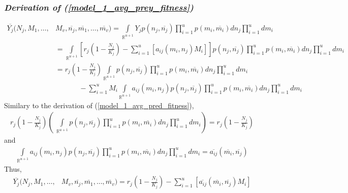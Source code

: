 \documentclass{amsart}
\theoremstyle{definition}
\theoremstyle{remark}
\numberwithin{equation}{section}
\begin{document}
\subsubsection*{\textbf{\textit{Derivation of (\ref{model_1_avg_prey_fitness})}}}
\begin{align*}
	\overline{Y_j}(N_j, M_1, \dots, &M_v, \overline{n_j}, \overline{m_1}, \dots, \overline{m_v}) = \int\limits_{\mathbb{R}^{u+1}}^{}Y_jp(n_j, \overline{n_j})\prod\limits_{i = 1}^{u}p(m_i, \overline{m_i})dn_j\prod\limits_{i = 1}^{u}dm_i \\
	&= \int\limits_{\mathbb{R}^{u+1}}\left[r_j\left(1 - \frac{N_j}{K_j}\right) - \sum\limits_{i = 1}^{u}\left[a_{ij}(m_i, n_j)M_i\right]\right]p(n_j, \overline{n_j})\prod\limits_{i = 1}^{u}p(m_i, \overline{m_i})dn_j\prod\limits_{i = 1}^{u}dm_i \\
	&= r_j\left(1 - \frac{N_j}{K_j}\right)\int\limits_{\mathbb{R}^{u+1}}p(n_j, \overline{n_j})\prod\limits_{i = 1}^{u}p(m_i, \overline{m_i})dn_j\prod\limits_{i = 1}^{u}dm_i \\
	&\ \ \ \ \ \ \ \ \ \ \ \ \ \ \ - \sum\limits_{i=1}^{u}M_i\int\limits_{\mathbb{R}^{u+1}}a_{ij}(m_i, n_j)p(n_j, \overline{n_j})\prod\limits_{i = 1}^{u}p(m_i, \overline{m_i})dn_j\prod\limits_{i = 1}^{u}dm_i
\end{align*}
Similary to the derivation of (\ref{model_1_avg_pred_fitness}),
\begin{align*}
	r_j\left(1 - \frac{N_j}{K_j}\right)\left(\ \int\limits_{\mathbb{R}^{u+1}}p(n_j, \overline{n_j})\prod\limits_{i = 1}^{u}p(m_i, \overline{m_i})dn_j\prod\limits_{i = 1}^{u}dm_i\right) = r_j\left(1 - \frac{N_j}{K_j}\right)
\end{align*}
and
\begin{align*}
	\int\limits_{\mathbb{R}^{u+1}}a_{ij}(m_i, n_j)p(n_j, \overline{n_j})\prod\limits_{i = 1}^{u}p(m_i, \overline{m_i})dn_j\prod\limits_{i = 1}^{u}dm_i = \overline{a_{ij}}(\overline{m_i}, \overline{n_j})
\end{align*}
Thus,
\begin{align*}
	\overline{Y_j}(N_j, M_1, \dots, &M_v, \overline{n_j}, \overline{m_1}, \dots, \overline{m_v}) = r_j\left(1 - \frac{N_j}{K_j}\right) - \sum\limits_{i = 1}^{u}\left[\overline{a_{ij}}(\overline{m_i}, \overline{n_j})M_i\right]
\end{align*}
\end{document}
